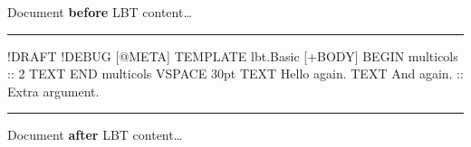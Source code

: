 \documentclass[a4paper,11pt]{article}
\begin{document}

  Document \textbf{before} LBT content\dots

  \noindent\rule{\textwidth}{0.5pt}

  \begin{lbt}
    !DRAFT
    !DEBUG
    [@META]
      TEMPLATE lbt.Basic
    [+BODY]
      BEGIN multicols :: 2
      TEXT \lipsum[1-5]
      END multicols
      VSPACE 30pt
      TEXT Hello again.
      TEXT And again. :: Extra argument.
  \end{lbt}

  \noindent\rule{\textwidth}{0.5pt}

  Document \textbf{after} LBT content\dots
\end{document}
